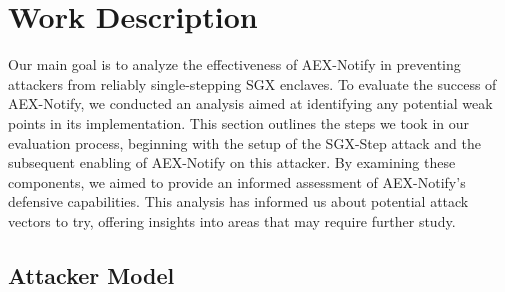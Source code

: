 \documentclass{llncs}
\begin{document}
\section{Work Description}

Our main goal is to analyze the effectiveness of AEX-Notify
in preventing attackers from reliably single-stepping SGX enclaves.
To evaluate the success of AEX-Notify,
we conducted an analysis aimed at identifying any potential weak points in its implementation.
This section outlines the steps we took in our evaluation process,
beginning with the setup of the SGX-Step attack and
the subsequent enabling of AEX-Notify on this attacker.
By examining these components,
we aimed to provide an informed assessment of AEX-Notify’s defensive capabilities.
This analysis has informed us about potential attack vectors to try,
offering insights into areas that may require further study.

\subsection{Attacker Model}
\end{document}
